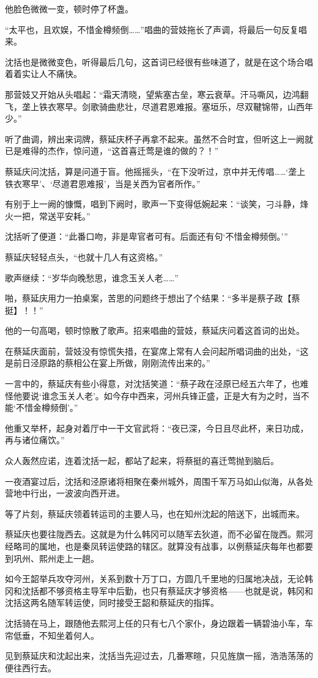 他脸色微微一变，顿时停了杯盏。

“太平也，且欢娱，不惜金樽频倒……”唱曲的营妓拖长了声调，将最后一句反复唱来。

沈括也是微微变色，听得最后几句，这首词已经很有些味道了，就是在这个场合唱着着实让人不痛快。

那营妓又开始从头唱起：“霜天清晓，望紫塞古垒，寒云衰草。汗马嘶风，边鸿翻飞，垄上铁衣寒早。剑歌骑曲悲壮，尽道君恩难报。塞垣乐，尽双鞬锦带，山西年少。”

听了曲调，辨出来词牌，蔡延庆杯子再拿不起来。虽然不合时宜，但听这上一阙就已是难得的杰作，惊问道，“这首喜迁莺是谁的做的？！”

蔡延庆问沈括，算是问道于盲。他摇摇头，“在下没听过，京中并无传唱……‘垄上铁衣寒早’、‘尽道君恩难报’，当是关西为官者所作。”

有别于上一阙的慷慨，唱到下阙时，歌声一下变得低婉起来：“谈笑，刁斗静，烽火一把，常送平安耗。”

沈括听了便道：“此番口吻，非是卑官者可有。后面还有句‘不惜金樽频倒。’”

蔡延庆轻轻点头，“也就十几人有这资格。”

歌声继续：“岁华向晚愁思，谁念玉关人老……”

啪，蔡延庆用力一拍桌案，苦思的问题终于想出了个结果：“多半是蔡子政【蔡挺】！！”

他的一句高喝，顿时惊散了歌声。招来唱曲的营妓，蔡延庆问着这首词的出处。

在蔡延庆面前，营妓没有惊慌失措，在宴席上常有人会问起所唱词曲的出处，“这是前日泾原路的蔡相公在宴上所做，刚刚流传出来的。”

一言中的，蔡延庆有些小得意，对沈括笑道：“蔡子政在泾原已经五六年了，也难怪他要说‘谁念玉关人老’。如今存中西来，河州兵锋正盛，正是大有为之时，当不能‘不惜金樽频倒’。”

他重又举杯，起身对着厅中一干文官武将：“夜已深，今日且尽此杯，来日功成，再与诸位痛饮。”

众人轰然应诺，连着沈括一起，都站了起来，将蔡挺的喜迁莺抛到脑后。

一夜酒宴过后，沈括和泾原诸将相聚在秦州城外，周围千军万马如山似海，从各处营地中行出，一波波向西开进。

等了片刻，蔡延庆领着转运司的主要人马，也在知州沈起的陪送下，出城而来。

蔡延庆也要往陇西去。这就是为什么韩冈可以随军去狄道，而不必留在陇西。熙河经略司的属地，也是秦凤转运使路的辖区。就算没有战事，以例蔡延庆每年也都要到巩州、熙州走上一趟。

如今王韶举兵攻夺河州，关系到数十万丁口，方圆几千里地的归属地决战，无论韩冈和沈括都不够资格主导军中后勤，也只有蔡延庆才够资格——也就是说，韩冈和沈括这两名随军转运使，同时接受王韶和蔡延庆的指挥。

沈括骑在马上，跟随他去熙河上任的只有七八个家仆，身边跟着一辆碧油小车，车帘低垂，不知坐着何人。

见到蔡延庆和沈起出来，沈括当先迎过去，几番寒暄，只见旌旗一摇，浩浩荡荡的便往西行去。

